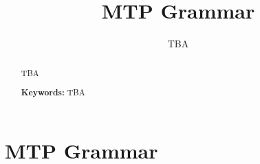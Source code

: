 \documentclass[10pt,a4paper]{article}
\title{MTP Grammar
}
\author{TBA
  }
\date{}
\begin{document}
\maketitle



\title{}


\begin{abstract}
TBA
\smallskip

\noindent\textbf{Keywords:} TBA
\end{abstract}



\section{MTP Grammar\label{sec:grammar}}






{


}







\end{document}

